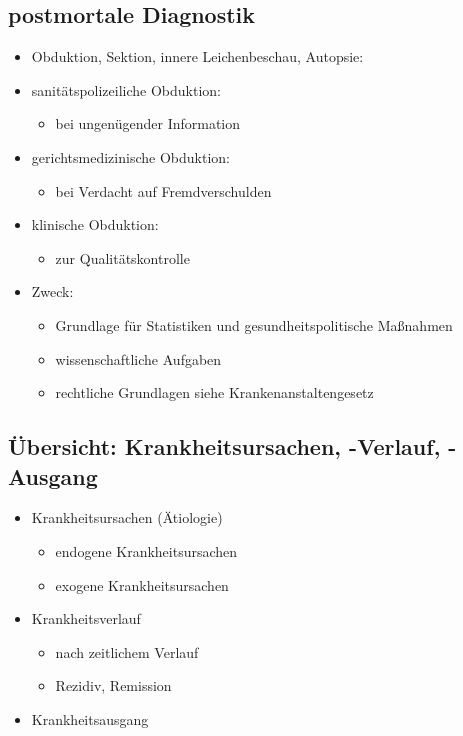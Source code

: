 \subsection{postmortale Diagnostik}
	\begin{itemize}
		\item Obduktion, Sektion, innere Leichenbeschau, Autopsie:
		\item sanitätspolizeiliche Obduktion:
			\begin{itemize}
				\item bei ungenügender Information
			\end{itemize}
		\item gerichtsmedizinische Obduktion:
			\begin{itemize}
				\item bei Verdacht auf Fremdverschulden
			\end{itemize}
		\item klinische Obduktion:
			\begin{itemize}
				\item zur Qualitätskontrolle
			\end{itemize}
		\item Zweck:
			\begin{itemize}
				\item Grundlage für Statistiken und gesundheitspolitische Maßnahmen
				\item wissenschaftliche Aufgaben
				\item rechtliche Grundlagen siehe Krankenanstaltengesetz
			\end{itemize}
	\end{itemize}

\subsection{Übersicht: Krankheitsursachen, -Verlauf, -Ausgang}
	\begin{itemize}
		\item Krankheitsursachen (Ätiologie)
			\begin{itemize}
				\item endogene Krankheitsursachen
				\item exogene Krankheitsursachen
			\end{itemize}
		\item Krankheitsverlauf
			\begin{itemize}
				\item nach zeitlichem Verlauf
				\item Rezidiv, Remission
			\end{itemize}
		\item Krankheitsausgang
	\end{itemize}

